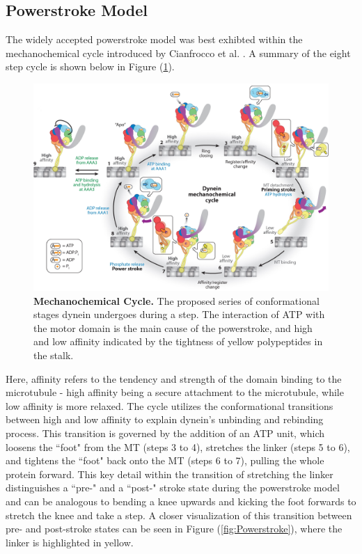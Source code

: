 \subsection{Powerstroke Model}

The widely accepted powerstroke model was best exhibted within the mechanochemical cycle introduced by Cianfrocco et al. \cite{Cianfrocco2015mechanism}. A summary of the eight step cycle is shown below in Figure (\ref{fig:MechanochemicalCycle}).

\begin{figure}[H]
	\centering
	\includegraphics[width=1\columnwidth]{Figures/mechanochemical_cycle.jpeg}
	\caption[Mechanochemical Cycle]{\textbf{Mechanochemical Cycle.} The proposed series of conformational stages dynein undergoes during a step. The interaction of ATP with the motor domain is the main cause of the powerstroke, and high and low affinity indicated by the tightness of yellow polypeptides in the stalk. \cite{Cianfrocco2015mechanism}}
	\label{fig:MechanochemicalCycle}
\end{figure}

Here, affinity refers to the tendency and strength of the domain binding to the microtubule - high affinity being a secure attachment to the microtubule, while low affinity is more relaxed. The cycle utilizes the conformational transitions between high and low affinity to explain dynein's unbinding and rebinding process. This transition is governed by the addition of an ATP unit, which loosens the ``foot" from the MT (steps 3 to 4), stretches the linker (steps 5 to 6), and tightens the ``foot" back onto the MT (steps 6 to 7), pulling the whole protein forward. This key detail within the transition of stretching the linker distinguishes a ``pre-" and a ``post-" stroke state during the powerstroke model and can be analogous to bending a knee upwards and kicking the foot forwards to stretch the knee and take a step. A closer visualization of this transition between pre- and post-stroke states can be seen in Figure (\ref{fig:Powerstroke}), where the linker is highlighted in yellow.  

